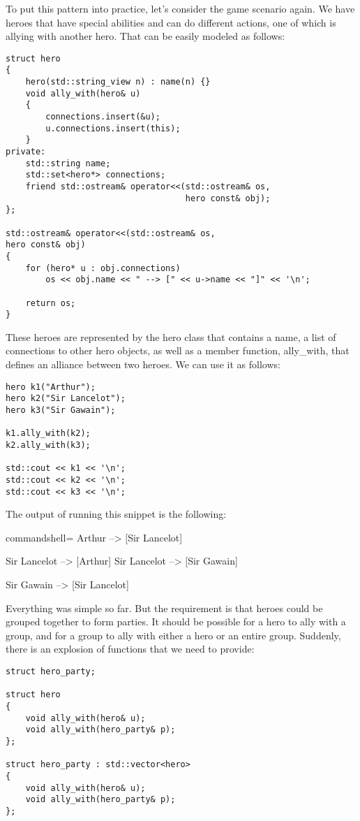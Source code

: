 To put this pattern into practice, let’s consider the game scenario again. We have heroes that have special abilities and can do different actions, one of which is allying with another hero. That can be easily modeled as follows:

\begin{lstlisting}[style=styleCXX]
struct hero
{
	hero(std::string_view n) : name(n) {}
	void ally_with(hero& u)
	{
		connections.insert(&u);
		u.connections.insert(this);
	}
private:
	std::string name;
	std::set<hero*> connections;
	friend std::ostream& operator<<(std::ostream& os,
									hero const& obj);
};

std::ostream& operator<<(std::ostream& os,
hero const& obj)
{
	for (hero* u : obj.connections)
		os << obj.name << " --> [" << u->name << "]" << '\n';
		
	return os;
}
\end{lstlisting}

These heroes are represented by the hero class that contains a name, a list of connections to other hero objects, as well as a member function, ally\_with, that defines an alliance between two heroes. We can use it as follows:

\begin{lstlisting}[style=styleCXX]
hero k1("Arthur");
hero k2("Sir Lancelot");
hero k3("Sir Gawain");

k1.ally_with(k2);
k2.ally_with(k3);

std::cout << k1 << '\n';
std::cout << k2 << '\n';
std::cout << k3 << '\n';
\end{lstlisting}

The output of running this snippet is the following:

\begin{tcblisting}{commandshell={}}
Arthur --> [Sir Lancelot]

Sir Lancelot --> [Arthur]
Sir Lancelot --> [Sir Gawain]

Sir Gawain --> [Sir Lancelot]
\end{tcblisting}

Everything was simple so far. But the requirement is that heroes could be grouped together to form parties. It should be possible for a hero to ally with a group, and for a group to ally with either a hero or an entire group. Suddenly, there is an explosion of functions that we need to provide:

\begin{lstlisting}[style=styleCXX]
struct hero_party;

struct hero
{
	void ally_with(hero& u);
	void ally_with(hero_party& p);
};

struct hero_party : std::vector<hero>
{
	void ally_with(hero& u);
	void ally_with(hero_party& p);
};
\end{lstlisting}

